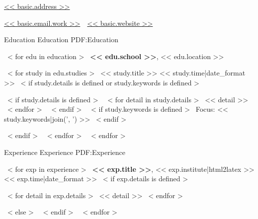 \documentclass[letterpaper,MMMyyyy,nonstopmode]{simpleresumecv}
\newcommand{\CVAuthor}{<< basic.name >>}
\newcommand{\CVWebpage}{<< basic.website >>}
\begin{document}

\Title{\CVAuthor}

\begin{SubTitle}
\href{https://www.google.com/maps/place/<< basic.address|urlencode >>}
{<< basic.address >>}
\par
\href{mailto:<< basic.email.work >>}
{<< basic.email.work >>}
\,\SubBulletSymbol\,
\href{\CVWebpage}
{\url{\CVWebpage}}
\end{SubTitle}

\begin{Body}


\Section
{Education}
{Education}
{PDF:Education}

~< for edu in education >~
    \Entry
    \textbf{<< edu.school >>},
    << edu.location >>

    \Gap
    ~< for study in edu.studies >~
        \BulletItem
        << study.title >>
        \hfill
        << study.time|date_format >>
        ~< if study.details is defined or study.keywords is defined >~
            \begin{Detail}
                ~< if study.details is defined >~
                    ~< for detail in study.details >~
                        \SubBulletItem
                        << detail >>
                    ~< endfor >~
                ~< endif >~
                ~< if study.keywords is defined >~
                    \SubBulletItem
                    Focus:
                    << study.keywords|join(', ') >>
                ~< endif >~
            \end{Detail}
        ~< endif >~
    ~< endfor >~
~< endfor >~


\Section
{Experience}
{Experience}
{PDF:Experience}

~< for exp in experience >~
    \Entry
    \textbf{<< exp.title >>},
    << exp.institute|html2latex >>
    \hfill
    << exp.time|date_format >>
    ~< if exp.details is defined >~
        \begin{Detail}
        ~< for detail in exp.details >~
            \BulletItem
            << detail >>
        ~< endfor >~
        \end{Detail}
    ~< else >~
        \Gap
    ~< endif >~
~< endfor >~



\end{Body}
\end{document}
